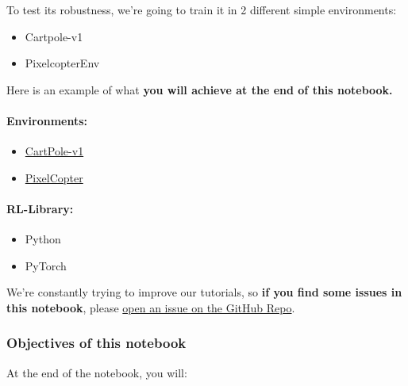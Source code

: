 \documentclass[11pt,a4paper]{article}
\begin{document}
To test its robustness, we're going to train it in 2 different simple environments:

\begin{itemize}
\tightlist
\item
  Cartpole-v1
\item
  PixelcopterEnv
\end{itemize}

Here is an example of what \textbf{you will achieve at the end of this notebook.}


\paragraph{Environments:}\label{environments}

\begin{itemize}
\tightlist
\item
  \href{https://www.gymlibrary.dev/environments/classic_control/cart_pole/}{CartPole-v1}
\item
  \href{https://pygame-learning-environment.readthedocs.io/en/latest/user/games/pixelcopter.html}{PixelCopter}
\end{itemize}

\paragraph{RL-Library:}\label{rl-library}

\begin{itemize}
\tightlist
\item
  Python
\item
  PyTorch
\end{itemize}

We're constantly trying to improve our tutorials, so \textbf{if you find some issues in this notebook}, please \href{https://github.com/huggingface/deep-rl-class/issues}{open an issue on the GitHub Repo}.

\subsubsection{Objectives of this notebook}\label{objectives-of-this-notebook}

At the end of the notebook, you will:
\end{document}
